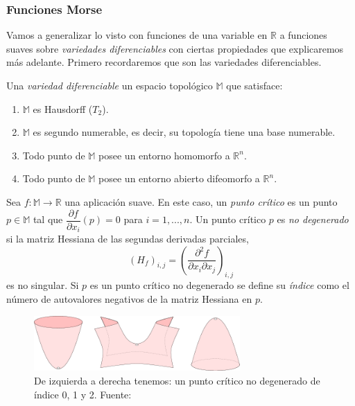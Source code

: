 \subsubsection*{Funciones Morse} 
Vamos a generalizar lo visto con funciones de una variable en $\mathbb{R}$ a funciones suaves sobre \emph{variedades diferenciables} con ciertas propiedades que explicaremos más adelante. Primero recordaremos que son las variedades diferenciables.

\begin{definition}
Una \emph{variedad diferenciable} un espacio topológico $\mathbb{M}$ que satisface:
\begin{enumerate}
	\item $\mathbb{M}$ es Hausdorff ($T_2$).
	\item $\mathbb{M}$ es segundo numerable, es decir, su topología tiene una base numerable.
	\item Todo punto de $\mathbb{M}$ posee un entorno homomorfo a $\mathbb{R}^n$.
	\item Todo punto de $\mathbb{M}$ posee un entorno abierto difeomorfo a $\mathbb{R}^n$.
\end{enumerate}
\end{definition}

Sea $f: \mathbb{M} \to \mathbb{R}$ una aplicación suave. En este caso, un \emph{punto crítico} es un punto $p \in \mathbb{M}$ tal que $\dfrac{\partial f}{\partial x_i}(p)=0$ para $i = 1, ..., n$. Un punto crítico $p$ es \emph{no degenerado} si la matriz Hessiana de las segundas derivadas parciales,
\[
(H_f)_{i,j}=\left(\dfrac{\partial^2 f}{\partial x_i \partial x_j}\right)_{i,j}
\]
es no singular. Si $p$ es un punto crítico no degenerado se define su \emph{índice} como el número de autovalores negativos de la matriz Hessiana en $p$.

\begin{figure}[!ht]
\centering
\includegraphics[width=0.7\textwidth]{include/figuras/From-left-to-right-a-minimum-saddle-and-maximum-of-the-vertical-height-function.png} 
\caption{De izquierda a derecha tenemos: un punto crítico no degenerado de índice 0, 1 y 2. Fuente: \cite{articuloPersistenciaEH}}
\label{ref:morseCriticos}
\end{figure}

